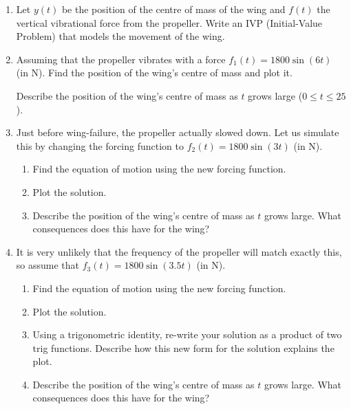 \begin{enumerate}[label=\emph{\arabic*.}]

\item Let $y(t)$ be the position of the centre of mass of the wing and $f(t)$ the vertical vibrational force from the propeller. Write an IVP (Initial-Value Problem) that models the movement of the wing.
%    

\item Assuming that the propeller vibrates with a force $f_1(t) = 1800 \sin(6t)$ (in N). Find the position of the wing's centre of mass and plot it.

Describe the position of the wing's centre of mass as $t$ grows large ($0 \leq t \leq 25$).


\item Just before wing-failure, the propeller actually slowed down. Let us simulate this by changing the forcing function to $f_2(t) = 1800 \sin(3 t)$ (in N).

\begin{enumerate}[label=\emph{(\alph*)}] 
\item Find the equation of motion using the new forcing function. 

\item Plot the solution.

\item Describe the position of the wing's centre of mass as $t$ grows large. What consequences does this have for the wing?
\end{enumerate}

\item It is very unlikely that the frequency of the propeller will match exactly this, so assume that $f_3(t) = 1800 \sin(3.5 t)$ (in N).
\begin{enumerate}[label=\emph{(\alph*)}] 
\item Find the equation of motion using the new forcing function. 

\item Plot the solution.

\item Using a trigonometric identity, re-write your solution as a product of two trig functions. Describe how this new form for the solution explains the plot.

\item Describe the position of the wing's centre of mass as $t$ grows large. What consequences does this have for the wing?

\end{enumerate}

\end{enumerate}




